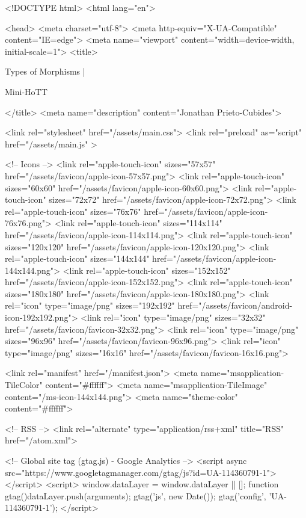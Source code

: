 <!DOCTYPE html>
<html lang="en">

<head>
  <meta charset="utf-8">
  <meta http-equiv="X-UA-Compatible" content="IE=edge">
  <meta name="viewport" content="width=device-width, initial-scale=1">
  <title>
    
      
        Types of Morphisms |
      
        Mini-HoTT
    
  </title>
  <meta name="description" content="Jonathan Prieto-Cubides">

  <link rel="stylesheet" href="/assets/main.css">
  <link rel="preload" as="script" href="/assets/main.js" >

  <!-- Icons -->
  <link rel="apple-touch-icon" sizes="57x57" href="/assets/favicon/apple-icon-57x57.png">
  <link rel="apple-touch-icon" sizes="60x60" href="/assets/favicon/apple-icon-60x60.png">
  <link rel="apple-touch-icon" sizes="72x72" href="/assets/favicon/apple-icon-72x72.png">
  <link rel="apple-touch-icon" sizes="76x76" href="/assets/favicon/apple-icon-76x76.png">
  <link rel="apple-touch-icon" sizes="114x114" href="/assets/favicon/apple-icon-114x114.png">
  <link rel="apple-touch-icon" sizes="120x120" href="/assets/favicon/apple-icon-120x120.png">
  <link rel="apple-touch-icon" sizes="144x144" href="/assets/favicon/apple-icon-144x144.png">
  <link rel="apple-touch-icon" sizes="152x152" href="/assets/favicon/apple-icon-152x152.png">
  <link rel="apple-touch-icon" sizes="180x180" href="/assets/favicon/apple-icon-180x180.png">
  <link rel="icon" type="image/png" sizes="192x192"  href="/assets/favicon/android-icon-192x192.png">
  <link rel="icon" type="image/png" sizes="32x32" href="/assets/favicon/favicon-32x32.png">
  <link rel="icon" type="image/png" sizes="96x96" href="/assets/favicon/favicon-96x96.png">
  <link rel="icon" type="image/png" sizes="16x16" href="/assets/favicon/favicon-16x16.png">

  <link rel="manifest" href="/manifest.json">
  <meta name="msapplication-TileColor" content="#ffffff">
  <meta name="msapplication-TileImage" content="/ms-icon-144x144.png">
  <meta name="theme-color" content="#ffffff">

  <!-- RSS -->
  <link rel="alternate" type="application/rss+xml" title="RSS" href="/atom.xml">

  <!-- Global site tag (gtag.js) - Google Analytics -->
  <script async src="https://www.googletagmanager.com/gtag/js?id=UA-114360791-1"></script>
  <script>
    window.dataLayer = window.dataLayer || [];
    function gtag(){dataLayer.push(arguments);}
    gtag('js', new Date());
    gtag('config', 'UA-114360791-1');
  </script>

